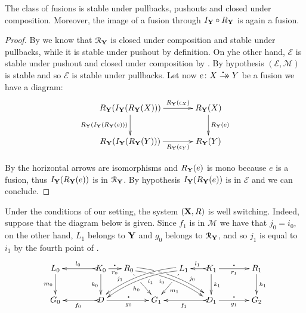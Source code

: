 \documentclass[a4paper,UKenglish,cleveref,pdftex,thm-restate,numberwithinsect]{lipics-v2021}
\newcommand{\xrightarrowdbl}[2][]{%
	\xrightarrow[#1]{#2}\mathrel{\mkern-14mu}\rightarrow
}
\newcommand{\mini}[0]{\scalebox{.4}{$\bullet$}}
\newcommand{\fto}[0]{\xrightarrowdbl{\mini}}
\def\R{\mathsf{R}}
\def\X{\textbf {\textup{X}}}
\def\Y{\textbf {\textup{Y}}}
\def\G{\textbf {\textup{G}}}
\begin{document}
\begin{proposition}\label{prop:fusion}
	The class of fusions is stable under pullbacks, pushouts and closed under composition. Moreover, the image of a fusion through $I_\Y\circ R_{\Y}$ is again a fusion.
\end{proposition}
\begin{proof}
	By  we know that $\mathcal{R}_\Y$ is closed under composition and stable under pullbacks, while it is stable under pushout by definition. On yhe other hand, $\mathcal{E}$ is stable under pushout and closed under composition by . By hypothesis $(\mathcal{E}, \mathcal{M})$ is stable and so $\mathcal{E}$ is stable under pullbacks. Let now $e\colon X\fto Y$ be a fusion we have a diagram:
	\[\xymatrix@C=35pt{R_\Y(I_\Y(R_{\Y}(X))) \ar[r]^-{R_\Y(\epsilon_X)} \ar[d]_{R_\Y(I_\Y(R_\Y(e)))}&R_{\Y}(X) \ar[d]^{R_\Y(e)}\\R_\Y(I_\Y(R_{\Y}(Y))) \ar[r]_-{R_\Y(\epsilon_Y)}&R_\Y(Y)}\]
	
	By  the horizontal arrows are isomorphisms and $R_\Y(e)$ is mono because $e$ is a fusion, thus $I_\Y(R_\Y(e))$ is in $\mathcal{R}_\Y$. By hypothesis $I_\Y(R_\Y(e))$ is in $\mathcal{E}$ and we can conclude.
\end{proof}

\begin{example}
\end{example}

\begin{remark}\label{rem:ws}
Under the conditions of our setting, the system $(\X, \R)$ is well switching. Indeed, suppose that the diagram below is given. Since $f_1$ is in $\mathcal{M}$ we have that $j_0=i_0$, on the other hand, $L_1$ belongs to $\Y$ and $g_0$ belongs to $\mathcal{R}_\Y$, and so $j_1$ is equal to $i_1$ by the fourth point of .
	\[\xymatrix@C=15pt{L_0 \ar[d]_{m_0}&& K_0 \ar[d]_{k_0}\ar@{>->}[ll]_{l_0} \ar[r]_{r_0}^{\mini} & R_0 \ar@/^.3cm/@<-.5ex>[drrr]|(.22)\hole|(.32)\hole_(.4){i_0} \ar@<.5ex>@/^.3cm/[drrr]|(.3)\hole|(.39)\hole^(.7){j_0} \ar[dr]|(.29)\hole|(.35)\hole_{h_0} && L_1 \ar@<.5ex>@/_.3cm/[dlll]^(.4){i_1} \ar@<-.5ex>@/_.3cm/[dlll]_(.7){j_1} \ar[dl]|(.29)\hole|(.35)\hole^(.6){m_1}& K_1\ar[d]^{k_1}\ar@{>->}[l]_{l_1} \ar[rr]_{r_1}^{\mini} && R_1 \ar[d]^{h_1}\\G_0 && \ar@{>->}[ll]^{f_0} D \ar[rr]_{g_0}^{\mini}&& G_1  && \ar@{>->}[ll]^{f_1} D_1 \ar[rr]_{g_1}^{\mini}&& G_2}\]	
\end{remark}
\end{document}
